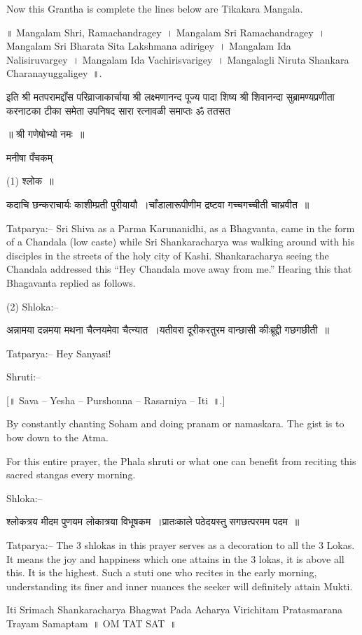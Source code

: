 Now this Grantha is complete the lines below are Tikakara Mangala.

॥ Mangalam Shri, Ramachandragey~। Mangalam Sri Ramachandragey~। Mangalam Sri Bharata Sita Lakshmana adirigey~। Mangalam Ida Nalisiruvargey~। Mangalam Ida Vachirisvarigey~। Mangalagli Niruta Shankara Charanayuggaligey~॥.

इति श्री मतपरामद्दाँस परिव्राजाकार्चाया श्री लक्ष्मणानन्द पूज्य पादा शिष्य श्री शिवानन्दा सुब्रामण्यप्रणीता करनाटका टीका समेता उपनिषद सारा रत्नावळी समाप्तः ॐ ततसत

॥ श्री गणेषोभ्यो नमः~॥

मनीषा पँचकम्

(1) श्लोक~॥

 कदाचि छन्कराचार्यः काशीम्प्रती पुरीयायौ~।चाँडालारूपीणीम द्रष्टवा गच्चगच्चीती चाभ्रवीत~॥

Tatparya:– Sri Shiva as a Parma Karunanidhi, as a Bhagvanta, came in the form of a Chandala (low caste) while Sri Shankaracharya was walking around with his disciples in the streets of the holy city of Kashi. Shankaracharya seeing the Chandala addressed this “Hey Chandala move away from me.” Hearing this that Bhagavanta replied as follows.

(2) Shloka:–

 अन्नामया दन्नमया मथना चैत्नयमेवा चैत्न्यात~।यतीवरा दूरीकरतुरम वान्छासी कीःब्रूद्दी गछगछीती~॥

Tatparya:– Hey Sanyasi!

Shruti:–

[॥ Sava – Yesha – Purshonna – Rasarniya – Iti~॥.]

By constantly chanting Soham and doing pranam or namaskara. The gist is to bow down to the Atma.

For this entire prayer, the Phala shruti or what one can benefit from reciting this sacred stangas every morning.

Shloka:–

 श्लोकत्रय मीदम पुणयम लोकात्रया विभूषकम~।प्रातःकाले पठेदयस्तु सगछत्परमम पदम~॥

Tatparya:– The 3 shlokas in this prayer serves as a decoration to all the 3 Lokas. It means the joy and happiness which one attains in the 3 lokas, it is above all this. It is the highest. Such a stuti one who recites in the early morning, understanding its finer and inner nuances the seeker will definitely attain Mukti.

Iti Srimach Shankaracharya Bhagwat Pada Acharya Virichitam Pratasmarana Trayam Samaptam~॥ OM TAT SAT~॥

